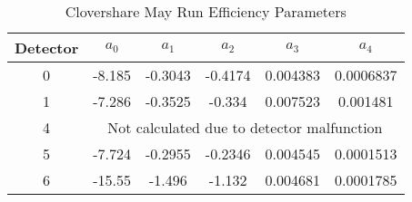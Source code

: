 \begin{table}[]
    \centering
    \caption{Clovershare May Run Efficiency Parameters}
    \begin{tabular}{c|c|c|c|c|c}
        \toprule
        Detector & $a_0$ & $a_1$ & $a_2$ & $a_3$ & $a_4$ \\
        \hline
        0	&	-8.185	&	-0.3043	&	-0.4174	&	0.004383	&	0.0006837	\\
        1	&	-7.286	&	-0.3525	&	-0.334	&	0.007523	&	0.001481	\\
        4	&	\multicolumn{5}{|c}{Not calculated due to detector malfunction}	\\
        5	&	-7.724	&	-0.2955	&	-0.2346	&	0.004545	&	0.0001513	\\
        6	&	-15.55	&	-1.496	&	-1.132	&	0.004681	&	0.0001785	\\
        \bottomrule
    \end{tabular}
    \label{tab:clover_may_eff}
\end{table}